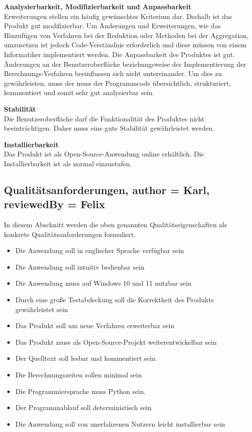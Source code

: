 \documentclass[parskip=full]{scrartcl} %
\begin{document}
\textbf{Analysierbarkeit, Modifizierbarkeit und Anpassbarkeit}\\
Erweiterungen stellen ein häufig gewünschtes Kriterium dar. Deshalb ist das Produkt gut modifizierbar. Um Änderungen und Erweiterungen, wie das Hinzufügen von Verfahren bei der Reduktion oder Methoden bei der Aggregation, umzusetzen ist jedoch Code-Verständnis erforderlich und diese müssen von einem Informatiker implementiert werden. Die Anpassbarkeit des Produktes ist gut. Änderungen an der Benutzeroberfläche beziehungsweise der Implementierung der Berechnungs-Verfahren beeinflussen sich nicht untereinander. Um dies zu gewährleisten, muss der muss der Programmcode übersichtlich, strukturiert, kommentiert und somit sehr gut analysierbar sein.

\textbf{Stabilität}\\
Die Benutzeroberfläche darf die Funktionalität des Produktes nicht beeinträchtigen. Daher muss eine gute Stabilität gewährleistet werden.

\textbf{Installierbarkeit}\\
Das Produkt ist als Open-Source-Anwendung online erhältlich. Die Installierbarkeit ist als normal einzustufen.


\newpage 


\subsection{Qualitätsanforderungen, author = Karl, reviewedBy = Felix}
In diesem Abschnitt werden die oben genannten Qualitätseigenschaften als konkrete Qualitätsanforderungen formuliert.

\begin{itemize}
    \item <Q1> Die Anwendung soll in englischer Sprache verfügbar sein
    \item <Q2> Die Anwendung soll intuitiv bedienbar sein
    \item <Q3> Die Anwendung muss auf Windows 10 und 11 nutzbar sein
    \item <Q4> Durch eine große Testabdeckung soll die Korrektheit des Produkts gewährleistet sein
    \item <Q5> Das Produkt soll um neue Verfahren erweiterbar sein
    \item <Q6> Das Produkt muss als Open-Source-Projekt weiterentwickelbar sein
    \item <Q7> Der Quelltext soll lesbar und kommentiert sein
    \item <Q8> Die Berechnungszeiten sollen minimal sein
    \item <Q9> Die Programmiersprache muss Python sein.
    \item <Q10> Der Programmablauf soll deterministisch sein
    \item <Q11> Die Anwendung soll von unerfahrenen Nutzern leicht installierbar sein
\end{itemize}
\end{document}
